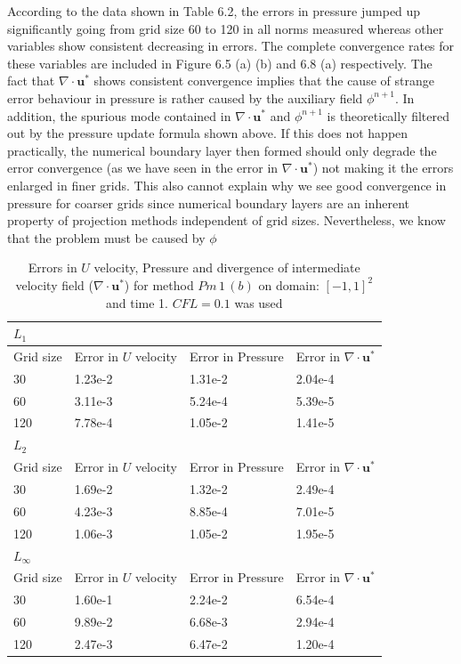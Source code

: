 According to the data shown in Table 6.2, the errors in pressure jumped up significantly going from grid size 60 to 120 in all norms measured whereas other variables show consistent decreasing in errors. The complete convergence rates for these variables are included in Figure 6.5 (a) (b) and 6.8 (a) respectively. The fact that $\nabla \cdot \textbf{u}^*$ shows consistent convergence implies that the cause of strange error behaviour in pressure is rather caused by the auxiliary field $\phi^{n+1}$. In addition, the spurious mode contained in $\nabla \cdot \textbf{u}^*$ and $\phi^{n+1}$ is theoretically filtered out by the pressure update formula shown above. If this does not happen practically, the numerical boundary layer then formed should only degrade the error convergence (as we have seen in the error in $\nabla \cdot \textbf{u}^*$) not making it the errors enlarged in finer grids. This also cannot explain why we see good convergence in pressure for coarser grids since numerical boundary layers are an inherent property of projection methods independent of grid sizes. Nevertheless, we know that the problem must be caused by $\phi$\\

\begin{table}[H]
\centering
\begin{tabular}{|l|l|l|l|}
	\hline
	 $L_1$  \\
	 \hline
	 Grid size & Error in $U$ velocity & Error in Pressure & Error in $\nabla \cdot \textbf{u}^*$\\
	\hline
	30 & 1.23e-2 & 1.31e-2 & 2.04e-4\\
	60 & 3.11e-3 & 5.24e-4 & 5.39e-5\\
	120 & 7.78e-4 & 1.05e-2 & 1.41e-5\\
	\hline
	 $L_2$ \\
	\hline
	Grid size & Error in $U$ velocity & Error in Pressure & Error in $\nabla \cdot \textbf{u}^*$\\
	\hline
	30 & 1.69e-2 & 1.32e-2 & 2.49e-4\\
	60 & 4.23e-3 & 8.85e-4 & 7.01e-5\\
	120 & 1.06e-3& 1.05e-2 & 1.95e-5\\
	\hline
	$L_\infty$\\
	\hline
	Grid size & Error in $U$ velocity & Error in Pressure & Error in $\nabla \cdot \textbf{u}^*$\\
	\hline
	30 & 1.60e-1 & 2.24e-2 & 6.54e-4\\
	60 & 9.89e-2 & 6.68e-3 & 2.94e-4\\
	120 & 2.47e-3& 6.47e-2 & 1.20e-4\\
	\hline
\end{tabular}
\caption{Errors in $U$ velocity, Pressure and divergence of intermediate velocity field ($\nabla \cdot \textbf{u}^*$) for method $Pm\,1\,(b)$ on domain: $[-1,1]^2$ and time 1. $CFL = 0.1$ was used}\label{table:2}
\end{table}

